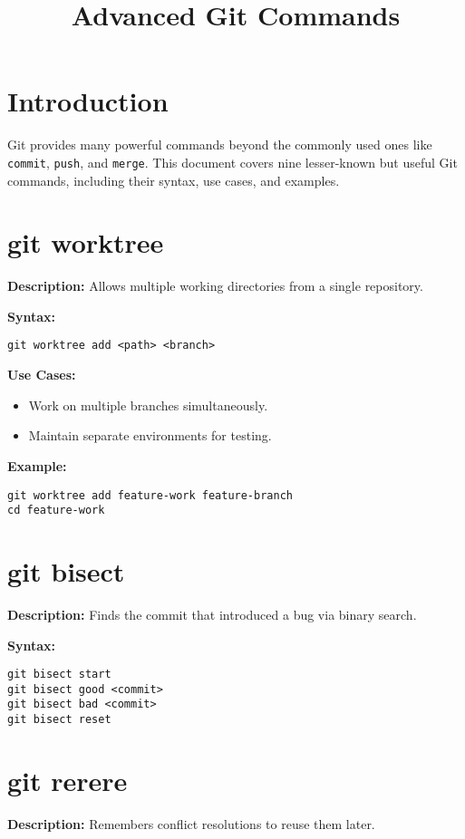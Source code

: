 \documentclass{article}
\begin{document}
\title{Advanced Git Commands}
\author{}
\date{}
\maketitle

\section{Introduction}
Git provides many powerful commands beyond the commonly used ones like \texttt{commit}, \texttt{push}, and \texttt{merge}. This document covers nine lesser-known but useful Git commands, including their syntax, use cases, and examples.

\section{git worktree}
\textbf{Description:} Allows multiple working directories from a single repository.

\textbf{Syntax:}
\begin{lstlisting}
git worktree add <path> <branch>
\end{lstlisting}

\textbf{Use Cases:}
\begin{itemize}
    \item Work on multiple branches simultaneously.
    \item Maintain separate environments for testing.
\end{itemize}

\textbf{Example:}
\begin{lstlisting}
git worktree add feature-work feature-branch
cd feature-work
\end{lstlisting}

\section{git bisect}
\textbf{Description:} Finds the commit that introduced a bug via binary search.

\textbf{Syntax:}
\begin{lstlisting}
git bisect start
git bisect good <commit>
git bisect bad <commit>
git bisect reset
\end{lstlisting}

\section{git rerere}
\textbf{Description:} Remembers conflict resolutions to reuse them later.
\end{document}
